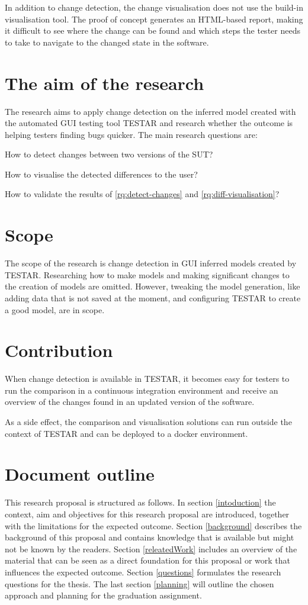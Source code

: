 In addition to change detection, the change visualisation does not use the build-in visualisation tool. The proof of concept generates an HTML-based report, making it difficult to see where the change can be found and which steps the tester needs to take to navigate to the changed state in the software.

\section{The aim of the research}
The research aims to apply change detection on the inferred model created with the automated GUI testing tool TESTAR and research whether the outcome is helping testers finding bugs quicker. The main research questions are:

\begin{questions}
    \item How to detect changes between two versions of the SUT?
	\item How to visualise the detected differences to the user? 
\item How to validate the results of \ref{rq:detect-changes} and \ref{rq:diff-visualisation}?
\end{questions}

\section{Scope}
The scope of the research is change detection in GUI inferred models created by TESTAR. Researching how to make models and making significant changes to the creation of models are omitted. However, tweaking the model generation, like adding data that is not saved at the moment, and configuring TESTAR to create a good model, are in scope.

\section{Contribution}
When change detection is available in TESTAR, it becomes easy for testers to run the comparison in a continuous integration environment and receive an overview of the changes found in an updated version of the software.

As a side effect, the comparison and visualisation solutions can run outside the context of TESTAR and can be deployed to a docker environment.

\section{Document outline}
This research proposal is structured as follows. In section \ref{intoduction} the context, aim and objectives for this research proposal are introduced, together with the limitations for the expected outcome. Section \ref{background} describes the background of this proposal and contains knowledge that is available but might not be known by the readers. Section \ref{releatedWork} includes an overview of the material that can be seen as a direct foundation for this proposal or work that influences the expected outcome. Section \ref{questions} formulates the research questions for the thesis. The last section \ref{planning} will outline the chosen approach and planning for the graduation assignment.